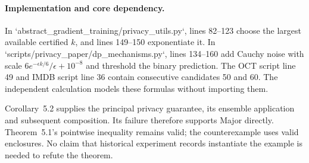 \documentclass[10pt]{article}
\begin{document}
\paragraph*{Implementation and core dependency.}\mbox{}\par
In `abstract\_gradient\_training/privacy\_utils.py`, lines 82–123 choose the largest available certified \(k\), and lines 149–150 exponentiate it. In `scripts/privacy\_paper/dp\_mechanisms.py`, lines 134–160 add Cauchy noise with scale \(6e^{-\epsilon k/6}/\epsilon+10^{-8}\) and threshold the binary prediction. The OCT script line 49 and IMDB script line 36 contain consecutive candidates 50 and 60. The independent calculation models these formulas without importing them.\par
Corollary 5.2 supplies the principal privacy guarantee, its ensemble application and subsequent composition. Its failure therefore supports Major directly. Theorem 5.1’s pointwise inequality remains valid; the counterexample uses valid enclosures. No claim that historical experiment records instantiate the example is needed to refute the theorem.\par
\end{document}
